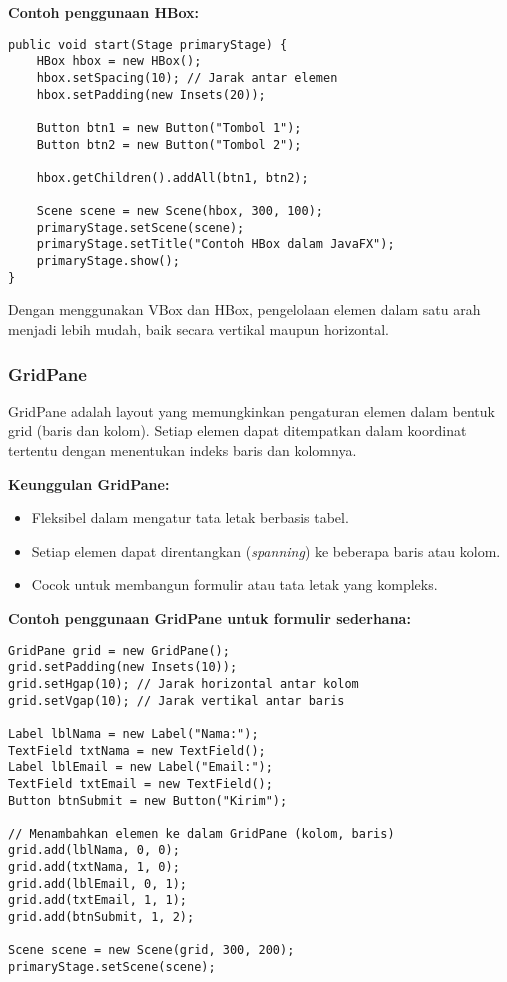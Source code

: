 \textbf{Contoh penggunaan HBox:}
\begin{lstlisting}[style=JavaStyle, caption=Menyusun elemen dalam HBox]
public void start(Stage primaryStage) {
	HBox hbox = new HBox();
	hbox.setSpacing(10); // Jarak antar elemen
	hbox.setPadding(new Insets(20));
	
	Button btn1 = new Button("Tombol 1");
	Button btn2 = new Button("Tombol 2");
	
	hbox.getChildren().addAll(btn1, btn2);
	
	Scene scene = new Scene(hbox, 300, 100);
	primaryStage.setScene(scene);
	primaryStage.setTitle("Contoh HBox dalam JavaFX");
	primaryStage.show();
}
\end{lstlisting}

Dengan menggunakan VBox dan HBox, pengelolaan elemen dalam satu arah menjadi lebih mudah, baik secara vertikal maupun horizontal.

\subsubsection{GridPane}

GridPane adalah layout yang memungkinkan pengaturan elemen dalam bentuk grid (baris dan kolom). Setiap elemen dapat ditempatkan dalam koordinat tertentu dengan menentukan indeks baris dan kolomnya.

\textbf{Keunggulan GridPane:}
\begin{itemize}
\item Fleksibel dalam mengatur tata letak berbasis tabel.
\item Setiap elemen dapat direntangkan (\textit{spanning}) ke beberapa baris atau kolom.
\item Cocok untuk membangun formulir atau tata letak yang kompleks.
\end{itemize}

\textbf{Contoh penggunaan GridPane untuk formulir sederhana:}
\begin{lstlisting}[style=JavaStyle, caption=Membuat formulir menggunakan GridPane]
GridPane grid = new GridPane();
grid.setPadding(new Insets(10));
grid.setHgap(10); // Jarak horizontal antar kolom
grid.setVgap(10); // Jarak vertikal antar baris

Label lblNama = new Label("Nama:");
TextField txtNama = new TextField();
Label lblEmail = new Label("Email:");
TextField txtEmail = new TextField();
Button btnSubmit = new Button("Kirim");

// Menambahkan elemen ke dalam GridPane (kolom, baris)
grid.add(lblNama, 0, 0);
grid.add(txtNama, 1, 0);
grid.add(lblEmail, 0, 1);
grid.add(txtEmail, 1, 1);
grid.add(btnSubmit, 1, 2);

Scene scene = new Scene(grid, 300, 200);
primaryStage.setScene(scene);
\end{lstlisting}

